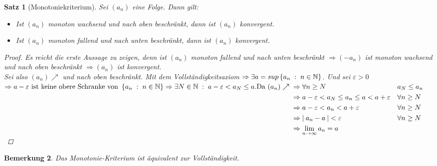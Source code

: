 \documentclass[a4paper,titlepage,oneside]{article}
\def\N{\ensuremath{\mathbb{N}} }
\renewcommand{\epsilon}{\ensuremath{\varepsilon} }
\def\sp{\hspace{0,1cm}}
\def\spcolon{\sp:\sp}
\renewcommand{\liminf}[2][n]{\ensuremath{\lim\limits_{#1 \rightarrow \infty}{#2}}}
\newcommand{\abs}[1]{\ensuremath{\left|\:#1\:\right|}}
\newcommand{\menge}[2]{\ensuremath{\left\{#1\sp : \sp #2\right\}}}
\theoremstyle{thmstyle}
\newtheorem{satz}{Satz}[section]
\newtheorem{bem}[satz]{Bemerkung}
\theoremstyle{subthmstyle}
\begin{document}
\begin{satz}[Monotoniekriterium]
Sei $(a_n)$ eine Folge. Dann gilt:
\begin{itemize}
\item Ist $(a_n)$ monoton wachsend und nach oben beschränkt, dann ist $(a_n)$ konvergent.
\item Ist $(a_n)$ monoton fallend  und nach unten beschränkt, dann ist $(a_n)$ konvergent.
\end{itemize}
\begin{proof}
Es reicht die erste Aussage zu zeigen, denn ist $(a_n)$ monoton fallend und nach unten beschränkt \( \Rightarrow (-a_n)\) ist monoton wachsend und nach oben beschränkt $\Rightarrow (a_n) $ ist konvergent.\\
Sei also \((a_n) \nearrow \) und nach oben beschränkt. Mit dem Vollständigkeitsaxiom \(\Rightarrow \exists a = sup\menge{a_n}{n \in \N}\). Und sei $\epsilon > 0$
\begin{math}
\Rightarrow a - \epsilon \text{ ist keine obere Schranke von } \menge{a_n}{n \in \N} \Rightarrow \exists N \in \N \spcolon a-\epsilon < a_N \le a.\\
\text{Da }(a_n) \nearrow \begin{aligned}[t]
					&\Rightarrow \forall n \ge N 						&& a_N \le a_n \\
					&\Rightarrow a-\epsilon < a_N \le a_n \le a < a+\epsilon 	&& \forall n \ge N \\
					&\Rightarrow a-\epsilon < a_n < a+\epsilon 			&& \forall n \ge N \\
					&\Rightarrow \abs{a_n - a} < \epsilon					&& \forall n \ge N \\
					&\Rightarrow \liminf{a_n} = a \end{aligned}\end{math}
\end{proof}
\end{satz}

\begin{bem}
Das Monotonie-Kriterium ist äquivalent zur Vollständigkeit.
\end{bem}
\end{document}
